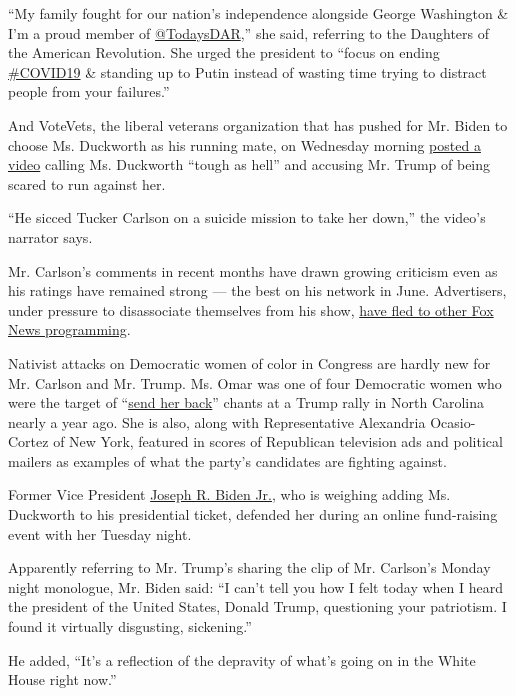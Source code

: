 ``My family fought for our nation's independence alongside George
Washington \& I'm a proud member of
\href{https://twitter.com/TodaysDAR}{@TodaysDAR},'' she said, referring
to the Daughters of the American Revolution. She urged the president to
``focus on ending
\href{https://twitter.com/hashtag/COVID19?src=hashtag_click}{\#COVID19}
\& standing up to Putin instead of wasting time trying to distract
people from your failures.''

And VoteVets, the liberal veterans organization that has pushed for Mr.
Biden to choose Ms. Duckworth as his running mate, on Wednesday morning
\href{https://www.youtube.com/watch?v=Rml8P9pXmXw}{posted a video}
calling Ms. Duckworth ``tough as hell'' and accusing Mr. Trump of being
scared to run against her.

``He sicced Tucker Carlson on a suicide mission to take her down,'' the
video's narrator says.

Mr. Carlson's comments in recent months have drawn growing criticism
even as his ratings have remained strong --- the best on his network in
June. Advertisers, under pressure to disassociate themselves from his
show,
\href{https://www.nytimes.com/2020/06/18/business/media/tucker-carlson-advertisers-ratings.html}{have
fled to other Fox News programming}.

Nativist attacks on Democratic women of color in Congress are hardly new
for Mr. Carlson and Mr. Trump. Ms. Omar was one of four Democratic women
who were the target of
``\href{https://www.nytimes.com/2019/07/17/us/politics/trump-send-her-back-ilhan-omar.html}{send
her back}'' chants at a Trump rally in North Carolina nearly a year ago.
She is also, along with Representative Alexandria Ocasio-Cortez of New
York, featured in scores of Republican television ads and political
mailers as examples of what the party's candidates are fighting against.

Former Vice President
\href{https://www.nytimes.com/interactive/2020/us/elections/joe-biden.html}{Joseph
R. Biden Jr.}, who is weighing adding Ms. Duckworth to his presidential
ticket, defended her during an online fund-raising event with her
Tuesday night.

Apparently referring to Mr. Trump's sharing the clip of Mr. Carlson's
Monday night monologue, Mr. Biden said: ``I can't tell you how I felt
today when I heard the president of the United States, Donald Trump,
questioning your patriotism. I found it virtually disgusting,
sickening.''

He added, ``It's a reflection of the depravity of what's going on in the
White House right now.''

